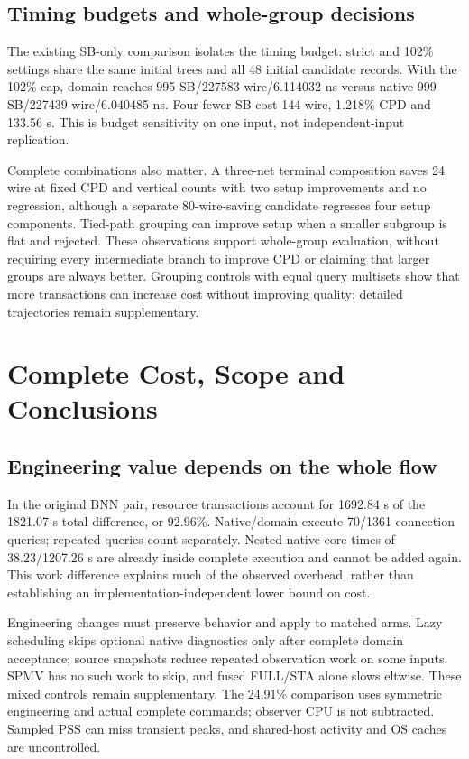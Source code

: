 \documentclass[conference,10pt]{IEEEtran}
\begin{document}
\subsection{Timing budgets and whole-group decisions}
The existing SB-only comparison isolates the timing budget: strict and 102\% settings share the same initial trees and all 48 initial candidate records. With the 102\% cap, domain reaches 995 SB/227583 wire/6.114032 ns versus native 999 SB/227439 wire/6.040485 ns. Four fewer SB cost 144 wire, 1.218\% CPD and 133.56 s. This is budget sensitivity on one input, not independent-input replication.

Complete combinations also matter. A three-net terminal composition saves 24 wire at fixed CPD and vertical counts with two setup improvements and no regression, although a separate 80-wire-saving candidate regresses four setup components. Tied-path grouping can improve setup when a smaller subgroup is flat and rejected. These observations support whole-group evaluation, without requiring every intermediate branch to improve CPD or claiming that larger groups are always better. Grouping controls with equal query multisets show that more transactions can increase cost without improving quality; detailed trajectories remain supplementary.

\section{Complete Cost, Scope and Conclusions}
\subsection{Engineering value depends on the whole flow}
In the original BNN pair, resource transactions account for 1692.84 s of the 1821.07-s total difference, or 92.96\%. Native/domain execute 70/1361 connection queries; repeated queries count separately. Nested native-core times of 38.23/1207.26 s are already inside complete execution and cannot be added again. This work difference explains much of the observed overhead, rather than establishing an implementation-independent lower bound on cost.

Engineering changes must preserve behavior and apply to matched arms. Lazy scheduling skips optional native diagnostics only after complete domain acceptance; source snapshots reduce repeated observation work on some inputs. SPMV has no such work to skip, and fused FULL/STA alone slows eltwise. These mixed controls remain supplementary. The 24.91\% comparison uses symmetric engineering and actual complete commands; observer CPU is not subtracted. Sampled PSS can miss transient peaks, and shared-host activity and OS caches are uncontrolled.
\end{document}
